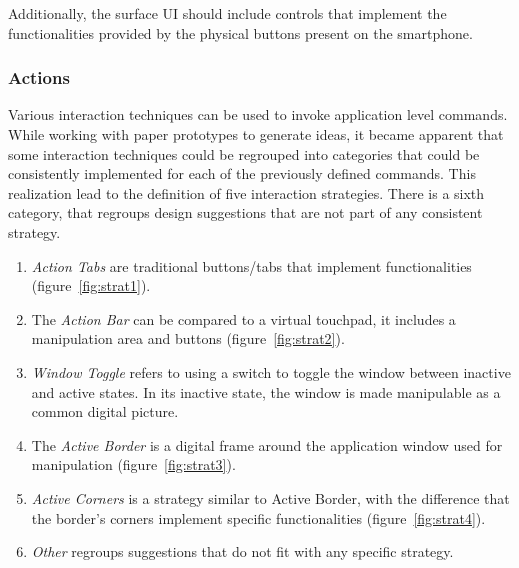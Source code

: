 Additionally, the surface UI should include controls that implement the functionalities provided by the physical buttons present on the smartphone.

\subsubsection{Actions}

Various interaction techniques can be used to invoke application level commands.
While working with paper prototypes to generate ideas, it became apparent that some interaction techniques could be regrouped into categories that could be consistently implemented for each of the previously defined commands.
This realization lead to the definition of five interaction strategies.
There is a sixth category, that regroups design suggestions that are not part of any consistent strategy.

\begin{enumerate}
\item{\emph{Action Tabs} are traditional buttons/tabs that implement functionalities (figure~\ref{fig:strat1}).}
\item{The \emph{Action Bar} can be compared to a virtual touchpad, it includes a manipulation area and buttons (figure~\ref{fig:strat2}).}
\item{\emph{Window Toggle} refers to using a switch to toggle the window between inactive and active states. In its inactive state, the window is made manipulable as a common digital picture.}
\item{The \emph{Active Border} is a digital frame around the application window used for manipulation (figure~\ref{fig:strat3}).}
\item{\emph{Active Corners} is a strategy similar to Active Border, with the difference that the border's corners implement specific functionalities (figure~\ref{fig:strat4}).}
\item{\emph{Other} regroups suggestions that do not fit with any specific strategy.}
\end{enumerate}

